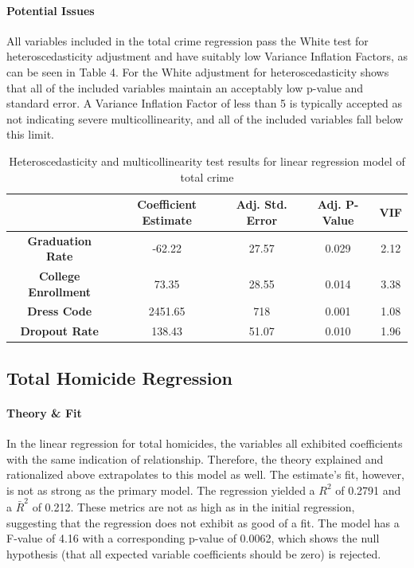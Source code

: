 \documentclass[12pt]{article}
\begin{document}
	\paragraph{Potential Issues}All variables included in the total crime regression pass the White test for heteroscedasticity adjustment and have suitably low Variance Inflation Factors, as can be seen in Table 4.  For the White adjustment for heteroscedasticity shows that all of the included variables maintain an acceptably low p-value and standard error.  A Variance Inflation Factor of less than 5 is typically accepted as not indicating severe multicollinearity, and all of the included variables fall below this limit.

	\begin{center}
		\begin{table}[h]
			\begin{tabular}{ c | c | c | c | c }
				
				& \textbf{Coefficient Estimate} & \textbf{Adj. Std. Error} & \textbf{Adj. P-Value} & \textbf{VIF} \\
				\hline
				\textbf{Graduation Rate} & -62.22 & 27.57 & 0.029 & 2.12  \\
				\textbf{College Enrollment} & 73.35 & 28.55 & 0.014 & 3.38 \\
				\textbf{Dress Code} & 2451.65 & 718 & 0.001 & 1.08 \\
				\textbf{Dropout Rate} & 138.43 & 51.07 & 0.010 & 1.96
				
			\end{tabular}
			\caption{Heteroscedasticity and multicollinearity test results for linear regression model of total crime}
		\end{table}
	\end{center}
	

	\subsection{Total Homicide Regression}

	\paragraph{Theory \& Fit}  In the linear regression for total homicides, the variables all exhibited coefficients with the same indication of relationship.  Therefore, the theory explained and rationalized above extrapolates to this model as well.  The estimate's fit, however, is not as strong as the primary model.  The regression yielded a $ R^{2} $ of 0.2791 and a $ \bar{R}^{2} $ of 0.212.  These metrics are not as high as in the initial regression, suggesting that the regression does not exhibit as good of a fit.  The model has a F-value of 4.16 with a corresponding p-value of 0.0062, which shows the null hypothesis (that all expected variable coefficients should be zero) is rejected.
	
\end{document}
